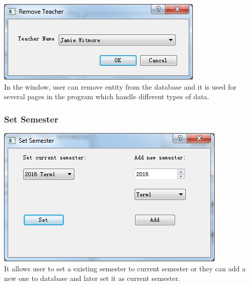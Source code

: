 \includegraphics[scale=0.5]{pics/remove.png}\\
In the window, user can remove entity from the database and it is used for several pages in the program which handle different types of data.\\

\subsubsection{Set Semester}
\includegraphics[scale=0.5]{pics/set_semester.png}\\
It allows user to set a existing semester to current semester or they can add a new one to database and later set it as current semester.

